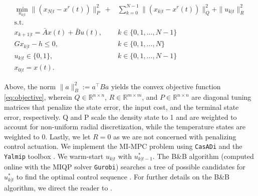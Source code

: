 \documentclass[journal,twoside,web]{ieeecolor}
\begin{document}
\begin{subequations}
\begin{align}
\min_{u_{k|t}} \|(x_{N|t}-x^r(t))\|^2_P ~+& \sum_{k=0}^{N-1} \|(x_{k|t}-x^r(t))\|^2_Q + \|u_{k|t}\|^2_R  \label{eq:objective} \\ 
\textrm{s.t.}&  \nonumber \\
x_{k+1|t} = \bar{A}x(t)+\bar{B}u(t),  \quad & k \in \{0,1,\ldots,N-1\} \label{eq:stateEvo} \\
Gx_{k|t}-h \leq 0, \quad  & k \in \{0,1,\ldots,N\} \label{eq:lincons}    \\
u_{k|t} \in \{0,1\}, \quad  &  k \in \{0,1,\ldots,N-1\} \label{eq:binary} \\
x_{0|t} = x(t). \quad &
\end{align} \label{eq:MIQP}
\end{subequations} 

\noindent Above, the norm $\|a\|^2_B := a^\top B a$ yields the convex objective function \eqref{eq:objective}, wherein $Q \in \mathbb{R}^{n\times n}$, $R \in \mathbb{R}^{m\times m}$, and $P \in \mathbb{R}^{n\times n}$ are diagonal tuning matrices that penalize the state error, the input cost, and the terminal state error, respectively. Q and P scale the density state to 1 and are weighted to account for non-uniform radial discretization, while the temperature states are weighted to 0. Lastly, we let $R=0$ as we are not concerned with penalizing control actuation. We implement the MI-MPC problem using \texttt{CasADi} and the \texttt{Yalmip} toolbox \cite{Andersson2019, Lofberg2004}. We warm-start $u_{k|t}$ with $u^*_{k|t-1}$. The B\&B algorithm (computed online with the MIQP solver \texttt{Gurobi}) searches a tree of possible candidates for $u^*_{k|t}$ to find the optimal control sequence \cite{gurobi}. For further details on the B\&B algorithm, we direct the reader to \cite{gurobi}. 
\end{document}
